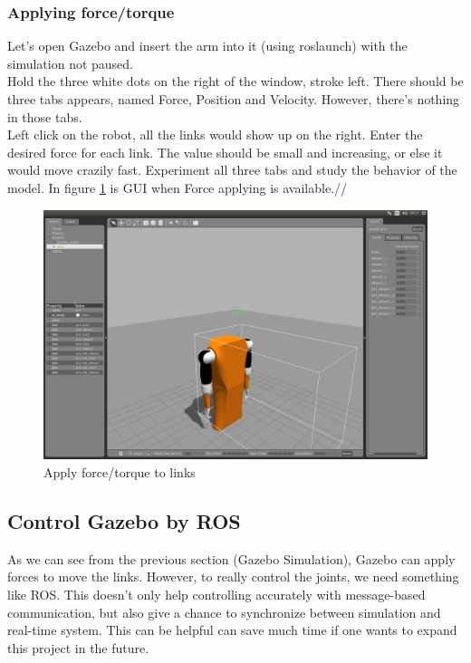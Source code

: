 \documentclass[pdftex,12pt,a4paper]{article}
\begin{document}
  \subsubsection{Applying force/torque}
  Let's open Gazebo and insert the arm into it (using roslaunch) with the simulation not paused.\\
  Hold the three white dots on the right of the window, stroke left. There should be three tabs appears, named Force, Position and Velocity. However, there's nothing in those tabs.\\
  Left click on the robot, all the links would show up on the right. Enter the desired force for each link. The value should be small and increasing, or else it would move crazily fast. Experiment all three tabs and study the behavior of the model. In figure \ref{fig:arm_gazebo_applyForce} is GUI when Force applying is available.//
  \begin{figure}[h]
      \centering
      \includegraphics[width=1\linewidth]{image/arm_gazebo_applyForce.png}
      \caption{Apply force/torque to links}
      \label{fig:arm_gazebo_applyForce}
  \end{figure}
  
  \newpage
  \subsection{Control Gazebo by ROS}
  As we can see from the previous section (Gazebo Simulation), Gazebo can apply forces to move the links. However, to really control the joints, we need something like ROS. This doesn't only help controlling accurately with message-based communication, but also give a chance to synchronize between simulation and real-time system. This can be helpful can save much time if one wants to expand this project in the future.
\end{document}
